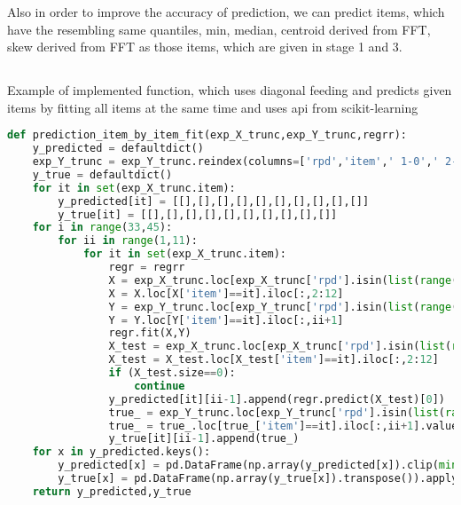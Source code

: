 \documentclass{article}
\begin{document}
Also in order to improve the accuracy of prediction, we can predict items, which have the resembling same quantiles, min, median, centroid derived from FFT, skew derived from FFT  as those items, which are given in stage 1 and 3.  


\begin{appendices}

\section{}
Example of implemented function, which uses diagonal feeding and predicts given items by fitting all items at the same time and uses api from scikit-learning



\label{appendix:one}
\begin{lstlisting}[language =Python, breaklines=True]  
def prediction_item_by_item_fit(exp_X_trunc,exp_Y_trunc,regrr):
    y_predicted = defaultdict()
    exp_Y_trunc = exp_Y_trunc.reindex(columns=['rpd','item',' 1-0',' 2-0',' 3-0',' 4-0',' 2-1',' 3-1',' 3-2',' 4-1',' 4-2',' 4-3'])
    y_true = defaultdict()
    for it in set(exp_X_trunc.item):
        y_predicted[it] = [[],[],[],[],[],[],[],[],[],[]]
        y_true[it] = [[],[],[],[],[],[],[],[],[],[]]
    for i in range(33,45):             
        for ii in range(1,11):
            for it in set(exp_X_trunc.item):
                regr = regrr
                X = exp_X_trunc.loc[exp_X_trunc['rpd'].isin(list(range(1,i+1)))]
                X = X.loc[X['item']==it].iloc[:,2:12]
                Y = exp_Y_trunc.loc[exp_Y_trunc['rpd'].isin(list(range(1,i+1)))]
                Y = Y.loc[Y['item']==it].iloc[:,ii+1]
                regr.fit(X,Y)          
                X_test = exp_X_trunc.loc[exp_X_trunc['rpd'].isin(list(range(i+1,i+2)))]
                X_test = X_test.loc[X_test['item']==it].iloc[:,2:12]
                if (X_test.size==0):
                    continue
                y_predicted[it][ii-1].append(regr.predict(X_test)[0])
                true_ = exp_Y_trunc.loc[exp_Y_trunc['rpd'].isin(list(range(i+1,i+2)))]
                true_ = true_.loc[true_['item']==it].iloc[:,ii+1].values[0]
                y_true[it][ii-1].append(true_)
    for x in y_predicted.keys():
        y_predicted[x] = pd.DataFrame(np.array(y_predicted[x]).clip(min=0).transpose())
        y_true[x] = pd.DataFrame(np.array(y_true[x]).transpose()).applymap(float)
    return y_predicted,y_true
\end{lstlisting}

\end{appendices}
\end{document}

